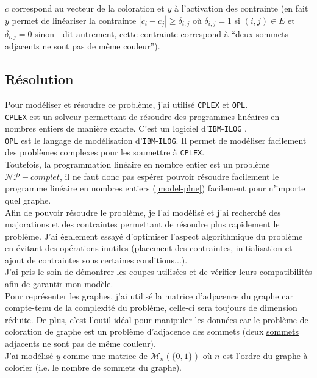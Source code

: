 $c$ correspond au vecteur de la coloration et $y$ à l'activation des contrainte (en fait
$y$ permet de linéariser la contrainte $|c_i-c_j| \geq \delta_{i,j}$ où $\delta_{i,j}=1$
si $(i,j)\in E$ et $\delta_{i,j}=0$ sinon - dit autrement, cette contrainte correspond à
``deux sommets adjacents ne sont pas de même couleur'').\\

\subsection{Résolution}
Pour modéliser et résoudre ce problème, j'ai utilisé \verb?CPLEX? et \verb?OPL?.\\
\verb?CPLEX? est un solveur permettant de résoudre des programmes linéaires en nombres entiers
de manière exacte. C'est un logiciel d'\verb?IBM?-\verb?ILOG? \cite{ibm}.\\
\verb?OPL? est le langage de modélisation d'\verb?IBM?-\verb?ILOG?. Il permet de
modéliser facilement des problèmes complexes pour les soumettre à \verb?CPLEX?.\\

Toutefois, la programmation linéaire en nombre entier est un problème $\mathcal{NP}-complet$,
il ne faut donc pas espérer pouvoir résoudre facilement le programme linéaire en nombres
entiers (\ref{model-plne}) facilement pour n'importe quel graphe.\\

Afin de pouvoir résoudre le problème, je l'ai modélisé et j'ai recherché 
des majorations et des contraintes permettant de résoudre plus rapidement le problème.
J'ai également essayé d'optimiser l'aspect algorithmique du problème en évitant des opérations inutiles
(placement des contraintes, initialisation et ajout de contraintes sous certaines conditions...).\\
J'ai pris le soin de démontrer les coupes utilisées et de vérifier leurs compatibilités afin
de garantir mon modèle.\\

Pour représenter les graphes, j'ai utilisé la matrice d'adjacence du graphe car compte-tenu de la
complexité du problème, celle-ci sera toujours de dimension réduite. De plus, c'est l'outil idéal
pour manipuler les données car le problème de coloration de graphe est un problème d'adjacence des
sommets (deux \underline{sommets adjacents} ne sont pas de même couleur).\\

J'ai modélisé $y$ comme une matrice de $\mathcal{M}_n(\{0,1\})$ où $n$ est l'ordre du graphe
à colorier (i.e. le nombre de sommets du graphe).\\


